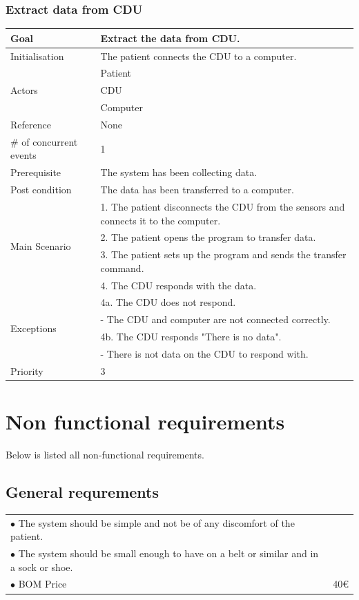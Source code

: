 \subsubsection{Extract data from CDU}
\begin{table}[H]
	\centering
	\begin{tabular}{|l|p{10cm}|}
	\hline
	Goal 							& Extract the data from CDU.\\ \hline
	Initialisation 					& The patient connects the CDU to a computer. \\ \hline
	\multirow{3}{*}{Actors} 		& Patient \\ 
									& CDU \\
									& Computer \\\hline
	Reference 						& None \\ \hline
	\# of concurrent events 		& 1 \\ \hline
	Prerequisite  					& The system has been collecting data.\\ \hline
	Post condition 					& The data has been transferred to a computer. \\ \hline
	\multirow{4}{*}{Main Scenario} 	& 1. The patient disconnects the CDU from the sensors and connects it to the computer. \\
									& 2. The patient opens the program to transfer data.\\
									& 3. The patient sets up the program and sends the transfer command.\\ 
									& 4. The CDU responds with the data. \\ \hline
	\multirow{4}{*}{Exceptions} & 4a. The CDU does not respond. \\ 
								& - The CDU and computer are not connected correctly.\\											& 4b. The CDU responds "There is no data". \\
								& - There is not data on the CDU to respond with.\\\hline
	Priority					& 3\\\hline
	\end{tabular}
\end{table}

\section{Non functional requirements}
Below is listed all non-functional requirements. \\

\subsection{General requrements}
\begin{table}[H]
\begin{tabular}{p{10cm} p{2cm}}
$\bullet$ The system should be simple and not be of any discomfort of the patient. & \\
$\bullet$ The system should be small enough to have on a belt or similar and in a sock or shoe. &\\
$\bullet$ BOM Price & 40€\\
\end{tabular}
\end{table}


